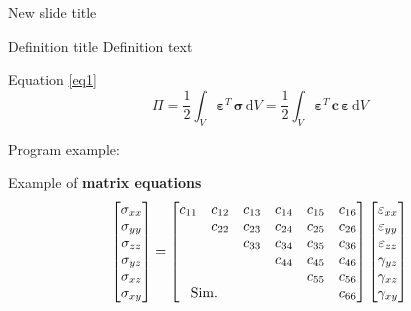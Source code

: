 \documentclass[12pt,aspectratio=169]{beamer}
\newcommand{\diff}[1]{\mathrm{d}#1}
\begin{document}
\begin{frame}{New slide title}
\begin{vazmfb_block}{Definition title}
    Definition text
\end{vazmfb_block}

Equation \ref{eq1} %
\begin{equation}
    \label{eq1}
    \Pi = \frac{1}{2} \int_{V} \bm{\varepsilon}^T\, \bm{\sigma}\, \text{d}V = \frac{1}{2} \int_{V} \bm{\varepsilon}^T\, \bm{c}\, \bm{\varepsilon}\, \diff{V}
\end{equation}

\end{frame}

\begin{frame}{}


Program example:


Example of \textbf{matrix equations} %
\footnotesize
\begin{equation}
    \begin{bmatrix}
       \sigma_{xx} \\
       \sigma_{yy} \\
       \sigma_{zz} \\
       \sigma_{yz} \\
       \sigma_{xz} \\
       \sigma_{xy} \\
    \end{bmatrix} 
     = 
    \begin{bmatrix}
       c_{11} & c_{12} & c_{13} & c_{14} & c_{15} & c_{16} \\
       & c_{22} & c_{23} & c_{24} & c_{25} & c_{26} \\
       & & c_{33} & c_{34} & c_{35} & c_{36} \\
       & & & c_{44} & c_{45} & c_{46} \\
       & & & & c_{55} & c_{56} \\
       \multicolumn{2}{c}{\text{Sim.}} & & & & c_{66} \\
    \end{bmatrix} 
    \begin{bmatrix}
       \varepsilon_{xx} \\
       \varepsilon_{yy} \\
       \varepsilon_{zz} \\
       \gamma_{yz} \\
       \gamma_{xz} \\
       \gamma_{xy} \\
    \end{bmatrix} 
\end{equation}

\end{frame}
\end{document}
